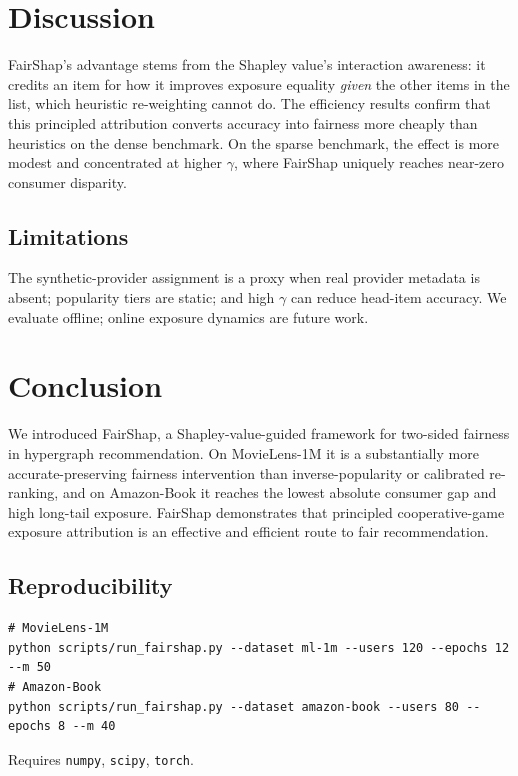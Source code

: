 \documentclass[pdflatex,sn-mathphys-num]{sn-jnl}%
\theoremstyle{thmstyleone}%
\theoremstyle{thmstyletwo}%
\theoremstyle{thmstylethree}%
\begin{document}
\section{Discussion}\label{sec5}

FairShap's advantage stems from the Shapley value's interaction awareness: it credits an item for how it improves exposure equality \emph{given} the other items in the list, which heuristic re-weighting cannot do. The efficiency results confirm that this principled attribution converts accuracy into fairness more cheaply than heuristics on the dense benchmark. On the sparse benchmark, the effect is more modest and concentrated at higher $\gamma$, where FairShap uniquely reaches near-zero consumer disparity.

\subsection{Limitations}
The synthetic-provider assignment is a proxy when real provider metadata is absent; popularity tiers are static; and high $\gamma$ can reduce head-item accuracy. We evaluate offline; online exposure dynamics are future work.

\section{Conclusion}\label{sec6}

We introduced FairShap, a Shapley-value-guided framework for two-sided fairness in hypergraph recommendation. On MovieLens-1M it is a substantially more accurate-preserving fairness intervention than inverse-popularity or calibrated re-ranking, and on Amazon-Book it reaches the lowest absolute consumer gap and high long-tail exposure. FairShap demonstrates that principled cooperative-game exposure attribution is an effective and efficient route to fair recommendation.

\backmatter

\begin{appendices}

\section{Reproducibility}\label{app:repro}
\begin{verbatim}
# MovieLens-1M
python scripts/run_fairshap.py --dataset ml-1m --users 120 --epochs 12 --m 50
# Amazon-Book
python scripts/run_fairshap.py --dataset amazon-book --users 80 --epochs 8 --m 40
\end{verbatim}
Requires \texttt{numpy}, \texttt{scipy}, \texttt{torch}.

\end{appendices}
\end{document}
